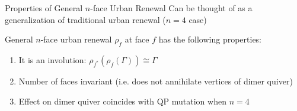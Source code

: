 \begin{frame}{Properties of General $n$-face Urban Renewal}
    Can be thought of as a generalization of traditional urban renewal ($n = 4$ case) \cite[Section~2.5]{fominIntroductionClusterAlgebras2021a}

    \begin{theorem}
        \justifying
        General $n$-face urban renewal $\rho_f$ at face $f$ has the following properties:
        \begin{enumerate}
            \justifying
            \item It is an involution: $\rho_{f^*}(\rho_f(\Gamma)) \cong \Gamma$
            
            \vspace{0.5cm}
    
            \item Number of faces invariant (i.e. does not annihilate vertices of dimer quiver)
            
            \vspace{0.5cm}
    
            \item Effect on dimer quiver coincides with QP mutation when $n = 4$
        \end{enumerate}
    \end{theorem}
\end{frame}

